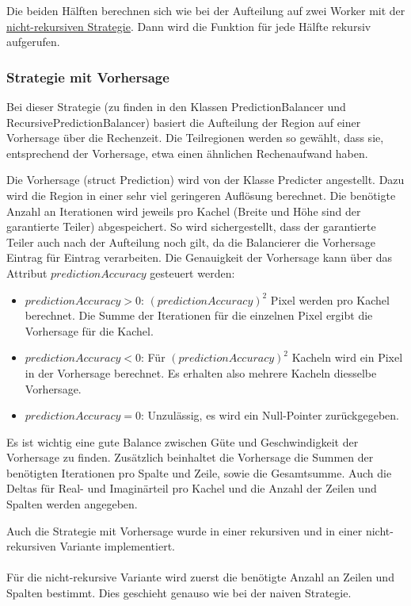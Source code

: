 Die beiden Hälften berechnen sich wie bei der Aufteilung auf zwei Worker mit der \hyperref[lastbalancierung_naiv]{nicht-rekursiven Strategie}.
Dann wird die Funktion für jede Hälfte rekursiv aufgerufen.

\subsubsection{Strategie mit Vorhersage}

Bei dieser Strategie (zu finden in den Klassen PredictionBalancer und RecursivePredictionBalancer) basiert die Aufteilung der Region auf einer Vorhersage über die Rechenzeit.
Die Teilregionen werden so gewählt, dass sie, entsprechend der Vorhersage, etwa einen ähnlichen Rechenaufwand haben.

Die Vorhersage (struct Prediction) wird von der Klasse Predicter angestellt.
Dazu wird die Region in einer sehr viel geringeren Auflösung berechnet.
Die benötigte Anzahl an Iterationen wird jeweils pro Kachel (Breite und Höhe sind der garantierte Teiler) abgespeichert.
So wird sichergestellt, dass der garantierte Teiler auch nach der Aufteilung noch gilt, da die Balancierer die Vorhersage Eintrag für Eintrag verarbeiten.
Die Genauigkeit der Vorhersage kann über das Attribut $predictionAccuracy$ gesteuert werden:
\begin{itemize}
	\item $predictionAccuracy > 0$: $(predictionAccuracy)^2$ Pixel werden pro Kachel berechnet. Die Summe der Iterationen für die einzelnen Pixel ergibt die Vorhersage für die Kachel.
	\item $predictionAccuracy < 0$: Für $(predictionAccuracy)^2$ Kacheln wird ein Pixel in der Vorhersage berechnet. Es erhalten also mehrere Kacheln diesselbe Vorhersage.
	\item $predictionAccuracy = 0$: Unzulässig, es wird ein Null-Pointer zurückgegeben.
\end{itemize}
Es ist wichtig eine gute Balance zwischen Güte und Geschwindigkeit der Vorhersage zu finden.
Zusätzlich beinhaltet die Vorhersage die Summen der benötigten Iterationen pro Spalte und Zeile, sowie die Gesamtsumme.
Auch die Deltas für Real- und Imaginärteil pro Kachel und die Anzahl der Zeilen und Spalten werden angegeben.

Auch die Strategie mit Vorhersage wurde in einer rekursiven und in einer nicht-rekursiven Variante implementiert.

\paragraph*{} \label{lastbalancierung_vorhersage}
Für die nicht-rekursive Variante wird zuerst die benötigte Anzahl an Zeilen und Spalten bestimmt.
Dies geschieht genauso wie bei der naiven Strategie.


